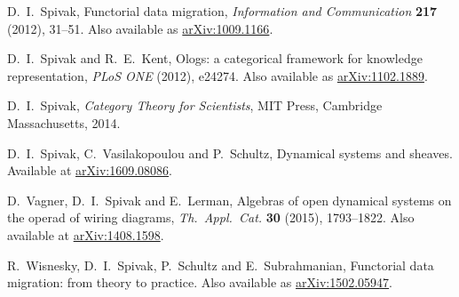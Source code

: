 \documentclass[12pt]{amsart}
\begin{document}
\begin{thebibliography}{10}
 D.\ I.\ Spivak, Functorial data migration, \textsl{Information and Communication} \textbf{217} (2012), 31--51.   Also available as \href{https://arxiv.org/abs/1009.1166}{arXiv:1009.1166}.

  D.\ I.\ Spivak and R.\ E.\ Kent, Ologs: a categorical framework for knowledge representation, \textsl{PLoS ONE} (2012), e24274.    Also available as 
\href{https://arxiv.org/abs/1102.1889}{arXiv:1102.1889}.

  D.\ I.\ Spivak, \textsl{Category Theory for Scientists}, MIT Press, Cambridge Massachusetts, 2014.

 D.\ I.\ Spivak, C.\ Vasilakopoulou and P.\ Schultz, Dynamical systems and sheaves.  Available at \href{https://arxiv.org/abs/1609.08086}{arXiv:1609.08086}.

 D.\ Vagner, D.\ I.\ Spivak and E.\ Lerman, Algebras of open dynamical systems on the operad of wiring diagrams, \textsl{Th.\ Appl.\ Cat.} \textbf{30} (2015), 1793--1822.   Also available at \href{https://arxiv.org/abs/1408.1598}{arXiv:1408.1598}.

  R.\ Wisnesky, D.\ I.\ Spivak, P.\ Schultz and E.\ Subrahmanian, Functorial data migration: from theory to practice.  Also available as \href{https://arxiv.org/abs/1502.05947}{arXiv:1502.05947}.
\end{thebibliography}


\end{document}
